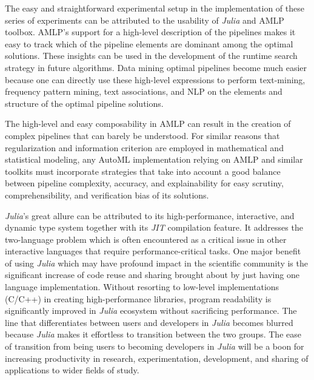 \documentclass{juliacon}
\begin{document}
\vskip 6pt

The easy and straightforward experimental setup in the implementation of these
series of experiments can be attributed to the 
usability of \emph{Julia} and AMLP toolbox.
AMLP's support for a high-level description of the pipelines
makes it easy to track which of the
pipeline elements are dominant among the optimal solutions. These insights can
be used in the development of the runtime search strategy in future algorithms.
Data mining optimal pipelines become much easier because one can
directly use these high-level expressions to perform text-mining,
frequency pattern mining, text associations,
and NLP on the elements and structure of the optimal pipeline solutions.

\vskip 6pt

The high-level and easy composability in AMLP can result in the creation of
complex pipelines that can barely be understood. For similar reasons that
regularization and information criterion are employed in mathematical and
statistical modeling, any AutoML implementation relying on AMLP and similar
toolkits must incorporate strategies that take into account a good balance
between pipeline complexity, accuracy, and explainability for easy scrutiny,
comprehensibility, and verification bias of its solutions.

\vskip 6pt

\emph{Julia}'s great allure can be attributed to
its high-performance, interactive, and dynamic type system
together with its \emph{JIT} compilation feature. It addresses the
two-language problem which is often encountered as a critical issue
in other interactive languages that require performance-critical tasks.
One major benefit of using \emph{Julia} which
may have profound impact in the scientific community is the significant
increase of code reuse and sharing brought about by just having one language
implementation.  Without resorting to low-level implementations (C/C++) in
creating high-performance libraries, program readability is significantly
improved in \emph{Julia} ecosystem without sacrificing performance. The line
that differentiates between users and developers in \emph{Julia} becomes blurred
because \emph{Julia} makes it effortless to
transition between the two groups. The ease of
transition from being users to becoming developers in \emph{Julia} will be a boon for
increasing productivity in research, experimentation, development, and
sharing of applications to wider fields of study.

\vskip 6pt
\end{document}

